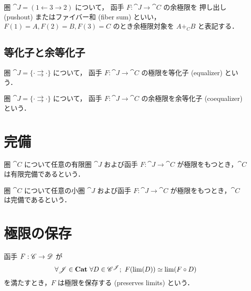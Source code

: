 \documentclass[titlepage]{ltjsreport}
\begin{document}
\begin{definition}[押し出し]
  圏 $\cat{J}=(1\leftarrow3\rightarrow2)$ について，
  函手 $F:\cat{J}\to\cat{C}$ の余極限を
  押し出し (pushout) またはファイバー和 (fiber sum) といい，
  $F(1)=A,F(2)=B,F(3)=C$ のとき余極限対象を $A{+}_{C}B$ と表記する．
\end{definition}

\subsection{等化子と余等化子}

\begin{definition}[等化子]
  圏 $\cat{J}=\{\cdot\rightrightarrows\cdot\}$ について，
  函手 $F:\cat{J}\to\cat{C}$ の極限を等化子 (equalizer) という．
  \begin{center}
    
  \end{center}
\end{definition}

\begin{definition}[余等化子]
  圏 $\cat{J}=\{\cdot\rightrightarrows\cdot\}$ について，
  函手 $F:\cat{J}\to\cat{C}$ の余極限を余等化子 (coequalizer) という．
  \begin{center}
    
  \end{center}
\end{definition}

\section{完備}

\begin{definition}[有限完備]
  圏 $\cat{C}$ について任意の有限圏 $\cat{J}$ および函手 $F:\cat{J}\to\cat{C}$
  が極限をもつとき，$\cat{C}$ は有限完備であるという．
\end{definition}

\begin{definition}[完備]
  圏 $\cat{C}$ について任意の小圏 $\cat{J}$ および函手 $F:\cat{J}\to\cat{C}$
  が極限をもつとき，$\cat{C}$ は完備であるという．
\end{definition}

\section{極限の保存}

\begin{definition}[極限の保存]
  \def\C{\cat{C}}%
  \def\D{\cat{D}}%
  \def\f{F}%
  \def\J{\cat{J}}%
  \def\diagram{D}%
  函手 $\mrp{\f}{\C}{\D}$ が
  \begin{equation}
    \forall\J\in\objs{\Cat}\ \forall\diagram\in\Fun{\J}{\C};
    \ \f(\lim(\diagram))\simeq\lim(\f\circ\diagram)
  \end{equation}
  を満たすとき，$\f$ は極限を保存する (preserves limits) という．
\end{definition}
\end{document}
